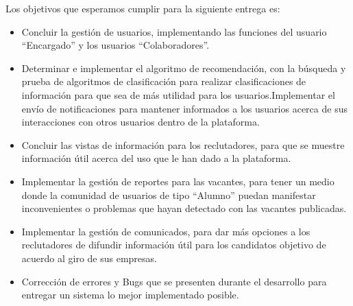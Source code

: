Los objetivos que esperamos cumplir para la siguiente entrega es:
\begin{itemize}
	\item Concluir la gestión de usuarios, implementando las funciones del usuario “Encargado” y los usuarios “Colaboradores”.
	\item Determinar e implementar el algoritmo de recomendación, con la búsqueda y prueba de algoritmos de clasificación para realizar clasificaciones de información para que sea de más utilidad para los usuarios.Implementar el envío de notificaciones para mantener informados a los usuarios acerca de sus interacciones con otros usuarios dentro de la plataforma.
	\item Concluir las vistas de información para los reclutadores, para que se muestre información útil acerca del uso que le han dado a la plataforma.
	\item Implementar la gestión de reportes para las vacantes, para tener un medio donde la comunidad de usuarios de tipo “Alumno” puedan manifestar inconvenientes o problemas que hayan detectado con las vacantes publicadas.
	\item Implementar la gestión de comunicados, para dar más opciones a los reclutadores de difundir información útil para los candidatos objetivo de acuerdo al giro de sus empresas.
	\item Corrección de errores y Bugs que se presenten durante el desarrollo para entregar un sistema lo mejor implementado posible.
\end{itemize}


